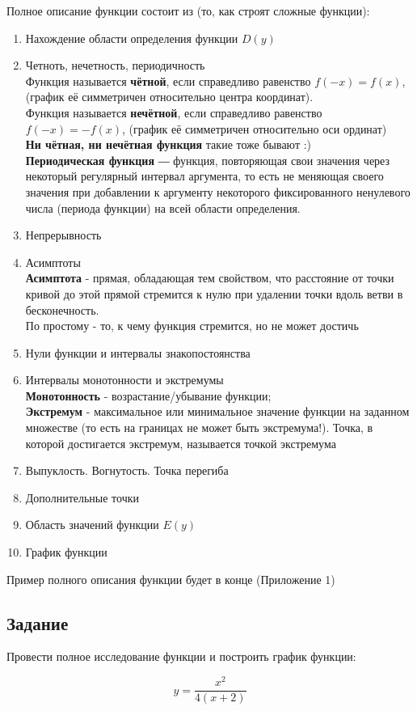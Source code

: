 Полное описание функции состоит из (то, как строят сложные функции):
\begin{enumerate}
    \item Нахождение области определения функции $D(y)$
    \item Четноть, нечетность, периодичность \\
    Функция называется \textbf{чётной}, если справедливо равенство
    $\displaystyle f(-x) = f(x)$, (график её симметричен относительно центра координат). \\
    Функция называется \textbf{нечётной}, если справедливо равенство
    $\displaystyle f(-x)=-f(x)$, (график её симметричен относительно оси ординат) \\
    \textbf{Ни чётная, ни нечётная функция} такие тоже бывают :) \\
    \textbf{Периодическая функция} ― функция, повторяющая свои значения через некоторый регулярный интервал аргумента, то есть не меняющая своего значения при добавлении к аргументу некоторого фиксированного ненулевого числа (периода функции) на всей области определения. 
    \item Непрерывность
    \item Асимптоты \\
    \textbf{Асимптота} - прямая, обладающая тем свойством, что расстояние от точки кривой до этой прямой стремится к нулю при удалении точки вдоль ветви в бесконечность. \\
    По простому - то, к чему функция стремится, но не может достичь
    \item Нули функции и интервалы знакопостоянства
    \item Интервалы монотонности и экстремумы \\
    \textbf{Монотонность} - возрастание/убывание функции; \\
    \textbf{Экстремум} - максимальное или минимальное значение функции на заданном множестве (то есть на границах не может быть экстремума!). Точка, в которой достигается экстремум, называется точкой экстремума
    \item Выпуклость. Вогнутость. Точка перегиба
    \item Дополнительные точки
    \item Область значений функции $E(y)$
    \item График функции
\end{enumerate}

Пример полного описания функции будет в конце (Приложение 1) 

\subsection{Задание}
Провести полное исследование функции и построить график функции:

\[
    y = \frac{x^2}{4(x+2)}
\]
